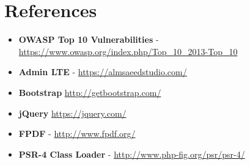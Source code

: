 \chapter{References}

\begin{itemize}
\item \textbf{OWASP Top 10 Vulnerabilities} - \url{https://www.owasp.org/index.php/Top\_10\_2013-Top\_10}
\item \textbf{Admin LTE} - \url{https://almsaeedstudio.com/}
\item \textbf{Bootstrap} \url{http://getbootstrap.com/}
\item \textbf{jQuery} \url{https://jquery.com/}
\item \textbf{FPDF} - \url{http://www.fpdf.org/}
\item \textbf{PSR-4 Class Loader} - \url{http://www.php-fig.org/psr/psr-4/}
\end{itemize}
